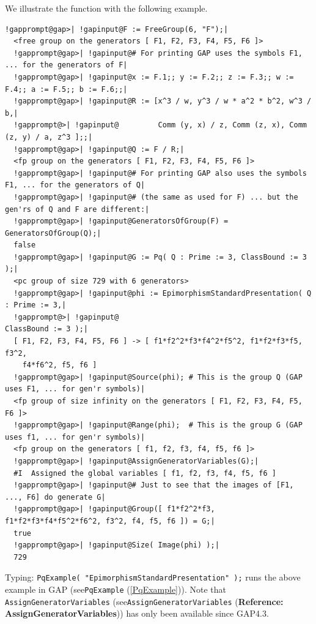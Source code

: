 \documentclass[a4paper,11pt]{report}
\begin{document}
{{{ We illustrate the function with the following example. 
\begin{Verbatim}[commandchars=!@|,fontsize=\small,frame=single,label=Example]
  !gapprompt@gap>| !gapinput@F := FreeGroup(6, "F");|
  <free group on the generators [ F1, F2, F3, F4, F5, F6 ]>
  !gapprompt@gap>| !gapinput@# For printing GAP uses the symbols F1, ... for the generators of F|
  !gapprompt@gap>| !gapinput@x := F.1;; y := F.2;; z := F.3;; w := F.4;; a := F.5;; b := F.6;;|
  !gapprompt@gap>| !gapinput@R := [x^3 / w, y^3 / w * a^2 * b^2, w^3 / b,|
  !gapprompt@>| !gapinput@         Comm (y, x) / z, Comm (z, x), Comm (z, y) / a, z^3 ];;|
  !gapprompt@gap>| !gapinput@Q := F / R;|
  <fp group on the generators [ F1, F2, F3, F4, F5, F6 ]>
  !gapprompt@gap>| !gapinput@# For printing GAP also uses the symbols F1, ... for the generators of Q|
  !gapprompt@gap>| !gapinput@# (the same as used for F) ... but the gen'rs of Q and F are different:|
  !gapprompt@gap>| !gapinput@GeneratorsOfGroup(F) = GeneratorsOfGroup(Q);|
  false
  !gapprompt@gap>| !gapinput@G := Pq( Q : Prime := 3, ClassBound := 3 );|
  <pc group of size 729 with 6 generators>
  !gapprompt@gap>| !gapinput@phi := EpimorphismStandardPresentation( Q : Prime := 3,|
  !gapprompt@>| !gapinput@                                               ClassBound := 3 );|
  [ F1, F2, F3, F4, F5, F6 ] -> [ f1*f2^2*f3*f4^2*f5^2, f1*f2*f3*f5, f3^2, 
    f4*f6^2, f5, f6 ]
  !gapprompt@gap>| !gapinput@Source(phi); # This is the group Q (GAP uses F1, ... for gen'r symbols)|
  <fp group of size infinity on the generators [ F1, F2, F3, F4, F5, F6 ]>
  !gapprompt@gap>| !gapinput@Range(phi);  # This is the group G (GAP uses f1, ... for gen'r symbols)|
  <fp group on the generators [ f1, f2, f3, f4, f5, f6 ]>
  !gapprompt@gap>| !gapinput@AssignGeneratorVariables(G);|
  #I  Assigned the global variables [ f1, f2, f3, f4, f5, f6 ]
  !gapprompt@gap>| !gapinput@# Just to see that the images of [F1, ..., F6] do generate G|
  !gapprompt@gap>| !gapinput@Group([ f1*f2^2*f3, f1*f2*f3*f4*f5^2*f6^2, f3^2, f4, f5, f6 ]) = G;|
  true
  !gapprompt@gap>| !gapinput@Size( Image(phi) );|
  729
\end{Verbatim}
 Typing: \texttt{PqExample( "EpimorphismStandardPresentation" );} runs the above example in \textsf{GAP} (see{\nobreakspace}\texttt{PqExample} (\ref{PqExample})). Note that \texttt{AssignGeneratorVariables} (see{\nobreakspace}\texttt{AssignGeneratorVariables} (\textbf{Reference: AssignGeneratorVariables})) has only been available since \textsf{GAP}{\nobreakspace}4.3. }

}}
\end{document}
